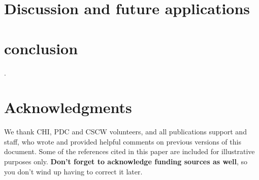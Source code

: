 \documentclass{sigchi}
\begin{document}
\section {Discussion and future applications}

\section {conclusion}
 \cite{Kim:2015ii}.



\section{Acknowledgments}

We thank CHI, PDC and CSCW volunteers, and all publications support
and staff, who wrote and provided helpful comments on previous
versions of this document.  Some of the references cited in this paper
are included for illustrative purposes only.  \textbf{Don't forget
to acknowledge funding sources as well}, so you don't wind up
having to correct it later.

%
%
%
%
%
\balance



\end{document}
